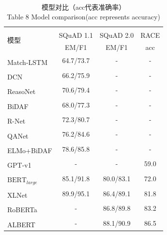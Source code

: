 \documentclass{article}
\newcommand{\upcite}[1]{\textsuperscript{\textsuperscript{\cite{#1}}}}
\begin{document}
\begin{table}[ht]
	\centering
	\caption{模型对比（acc代表准确率）\\ Table 8 Model comparison(acc represents accuracy)}
	\begin{tabular}{l c c c}
		\toprule
		\multirow{2}{*}{模型}&SQuAD 1.1\upcite{SQuAD1}& SQuAD 2.0\upcite{SQuAD2} & RACE\upcite{RACE}\\
		\cmidrule(lr){2-2} \cmidrule(lr){3-3} \cmidrule(lr){4-4}
		&EM/F1&EM/F1& acc \\
		\midrule
		Match-LSTM\upcite{MatchLSTM}& 64.7/73.7 & -&-\\
		\midrule
		DCN\upcite{DCN}& 66.2/75.9 &-&-\\
		\midrule
		ReasoNet\upcite{Reasonet}&70.6/79.4 &-&-\\
		\midrule
		BiDAF\upcite{BiDAF}&68.0/77.3 &-&-\\
		\midrule
		R-Net\upcite{RNet}&72.3/80.7 &-&-\\
		\midrule
		QANet\upcite{QANet}& 76.2/84.6&-&-\\
		\midrule
		ELMo+BiDAF\upcite{ELMo}&78.6/85.8&-&-\\
		\midrule
		GPT-v1\upcite{GPT}&-&-&59.0\\
		\midrule
		$\text{BERT}_{large}$\upcite{BERT}& 85.1/91.8 &80.0/83.1&72.0\\
		\midrule
		XLNet\upcite{XLNet}&89.9/95.1&86.4/89.1 &81.8\\
		\midrule
		RoBERTa\upcite{RoBERTa}&-&86.8/89.8 &83.2\\
		\midrule
		ALBERT\upcite{ALBERT}&-&88.1/90.9 &86.5\\
		\bottomrule
	\end{tabular}
\end{table}
\end{document}
